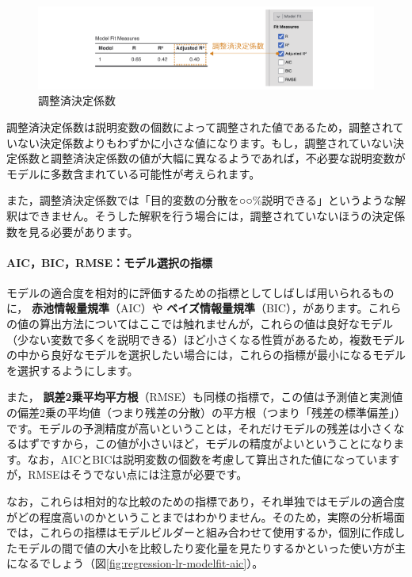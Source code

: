 \documentclass[
  12pt,
  a5jpaper,
  lualatex, ja=standard]{bxjsbook}
\renewcommand{\emph}[1]{\textbf{\color{emph} #1}}
\begin{document}
\begin{figure}[!ht]

{\centering \includegraphics[width=1\linewidth]{images/regression/lr-modelfit-adjrsq} 

}

\caption{調整済決定係数}\label{fig:regression-lr-modelfit-adjrsq}
\end{figure}

調整済決定係数は説明変数の個数によって調整された値であるため，調整されていない決定係数よりもわずかに小さな値になります。もし，調整されていない決定係数と調整済決定係数の値が大幅に異なるようであれば，不必要な説明変数がモデルに多数含まれている可能性が考えられます。

また，調整済決定係数では「目的変数の分散を○○\%説明できる」というような解釈はできません。そうした解釈を行う場合には，調整されていないほうの決定係数を見る必要があります。

\hypertarget{subsub:regression-modelselection}{%
\paragraph*{AIC，BIC，RMSE：モデル選択の指標}\label{subsub:regression-modelselection}}

モデルの適合度を相対的に評価するための指標としてしばしば用いられるものに，\emph{赤池情報量規準}（AIC）や\emph{ベイズ情報量規準}（BIC），があります。これらの値の算出方法についてはここでは触れませんが，これらの値は良好なモデル（少ない変数で多くを説明できる）ほど小さくなる性質があるため，複数モデルの中から良好なモデルを選択したい場合には，これらの指標が最小になるモデルを選択するようにします。

また，\emph{誤差2乗平均平方根}（RMSE）も同様の指標で，この値は予測値と実測値の偏差2乗の平均値（つまり残差の分散）の平方根（つまり「残差の標準偏差」）です。モデルの予測精度が高いということは，それだけモデルの残差は小さくなるはずですから，この値が小さいほど，モデルの精度がよいということになります。なお，AICとBICは説明変数の個数を考慮して算出された値になっていますが，RMSEはそうでない点には注意が必要です。

なお，これらは相対的な比較のための指標であり，それ単独ではモデルの適合度がどの程度高いのかということまではわかりません。そのため，実際の分析場面では，これらの指標はモデルビルダーと組み合わせて使用するか，個別に作成したモデルの間で値の大小を比較したり変化量を見たりするかといった使い方が主になるでしょう（図\ref{fig:regression-lr-modelfit-aic}）。
\end{document}
